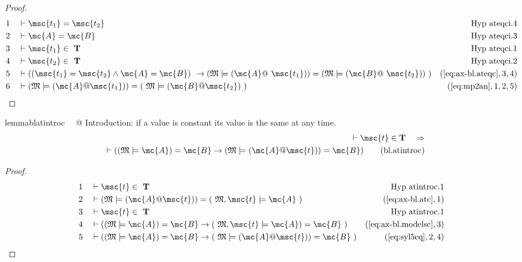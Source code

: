 \begin{proof}
\begin{align}
  1 &&  & \vdash \msc{t_1} = \msc{t_2}&\text{Hyp~ateqci.4}\notag%
  \\ 2 &&  & \vdash \mc{A} = \mc{B}&\text{Hyp~ateqci.3}\notag%
  \\ 3 &&  & \vdash \msc{t_1} \in
     ~\mathbf{T}&\text{Hyp~ateqci.1}\notag%
  \\ 4 &&  & \vdash \msc{t_2} \in
     ~\mathbf{T}&\text{Hyp~ateqci.2}\notag%
  \\ 5 &&  & \vdash ( ( \msc{t_1} = \msc{t_2} \wedge \mc{A} = \mc{B} )
     ~\rightarrow ( \mathfrak{M} \models ( \mc{A} @
     ~\msc{t_1} ) ) = ( \mathfrak{M} \models ( \mc{B} @
     ~\msc{t_2} ) )
     ~)&(\mbox{\ref{eq:ax-bl.ateqc}},3,4)\notag
  \\ 6 &&  & \vdash ( \mathfrak{M} \models ( \mc{A} @ \msc{t_1} ) ) = (
     ~\mathfrak{M} \models ( \mc{B} @ \msc{t_2} )
     ~)&(\mbox{\ref{eq:mp2an}},1,2,5)\notag
\end{align}
\end{proof}

\begin{restatable}{lemma}{blatintroc}~~ @ Introduction: if a value is constant
its value is the same at any time.
\begin{align}
\vdash \msc{t} \in \mathbf{T}\quad\Rightarrow \notag \\ 
	\quad \vdash ( ( \mathfrak{M}
    \models \mc{A} ) = \mc{B} \rightarrow ( \mathfrak{M} \models ( \mc{A} @
    \msc{t} ) ) = \mc{B} )\label{eq:bl.atintroc}\tag{bl.atintroc}
\end{align}
\end{restatable}

\begin{proof}
\begin{align}
  1 &&  & \vdash \msc{t} \in
     ~\mathbf{T}&\text{Hyp~atintroc.1}\notag%
  \\ 2 &&  & \vdash ( \mathfrak{M} \models ( \mc{A} @ \msc{t} ) ) = (
     ~\mathfrak{M} , \msc{t} \models \mc{A}
     ~)&(\mbox{\ref{eq:ax-bl.atc}},1)\notag
  \\ 3 &&  & \vdash \msc{t} \in
     ~\mathbf{T}&\text{Hyp~atintroc.1}\notag%
  \\ 4 &&  & \vdash ( ( \mathfrak{M} \models \mc{A} ) = \mc{B} \rightarrow (
     ~\mathfrak{M} , \msc{t} \models \mc{A} ) = \mc{B}
     ~)&(\mbox{\ref{eq:ax-bl.modelsc}},3)\notag
  \\ 5 &&  & \vdash ( ( \mathfrak{M} \models \mc{A} ) = \mc{B} \rightarrow (
     ~\mathfrak{M} \models ( \mc{A} @ \msc{t} ) ) = \mc{B}
     ~)&(\mbox{\ref{eq:syl5eq}},2,4)\notag
\end{align}
\end{proof}

